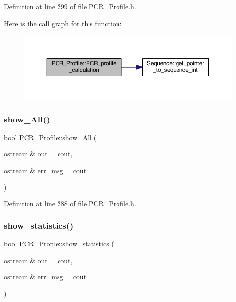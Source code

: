Definition at line 299 of file P\+C\+R\+\_\+\+Profile.\+h.

Here is the call graph for this function\+:
\nopagebreak
\begin{figure}[H]
\begin{center}
\leavevmode
\includegraphics[width=350pt]{class_p_c_r___profile_a339a01da69e5e709f6b33678bd9f73dc_cgraph}
\end{center}
\end{figure}
\mbox{\label{class_p_c_r___profile_aad744529e3bbcdc019d259667460340b}} 
\subsubsection{\texorpdfstring{show\+\_\+\+All()}{show\_All()}}
{\footnotesize\ttfamily bool P\+C\+R\+\_\+\+Profile\+::show\+\_\+\+All (\begin{DoxyParamCaption}\item[{ostream \&}]{out = {\ttfamily cout},  }\item[{ostream \&}]{err\+\_\+msg = {\ttfamily cout} }\end{DoxyParamCaption})}



Definition at line 288 of file P\+C\+R\+\_\+\+Profile.\+h.

\mbox{\label{class_p_c_r___profile_a9897676b415905e30809e69c399a859a}} 
\subsubsection{\texorpdfstring{show\+\_\+statistics()}{show\_statistics()}}
{\footnotesize\ttfamily bool P\+C\+R\+\_\+\+Profile\+::show\+\_\+statistics (\begin{DoxyParamCaption}\item[{ostream \&}]{out = {\ttfamily cout},  }\item[{ostream \&}]{err\+\_\+msg = {\ttfamily cout} }\end{DoxyParamCaption})}



